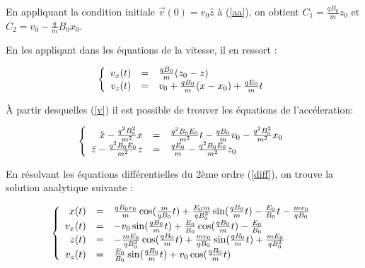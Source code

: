 \documentclass[a4paper,12pt,twoside]{article}
\begin{document}
		En appliquant la condition initiale $ \vec{v}(0) = v_0\hat{z}$ à (\ref{aa}), on obtient $C_1 = \frac{qB_0}{m}z_0 $ et $C_2 = v_0 -\frac{q}{m}B_0x_0$.

			
		En les appliqant dans les \'equations de la vitesse, il en ressort :
				
			\begin{equation}\label{v}
				\left \{
				\begin{array}{r c l}
					v_x(t) & = & \frac{qB_0}{m}(z_0 - z)\\
					v_z(t) & = & v_0 + \frac{qB_0}{m}(x-x_0) + \frac{qE_0}{m}t\\
				\end{array}
				\right .
			\end{equation}
			
		\`A partir desquelles (\ref{v}) il est possible de trouver les \'equations de l'acc\'eleration:
		
			\begin{equation} \label{diff}
				\left \{
				\begin{array}{r c l}
					\ddot{x} - \frac{q^2B_0^2}{m^2}x & = & \frac{q^2B_0E_0}{m^2}t-\frac{qB_0 }{m}v_0 - \frac{q^2B_0^2}{m^2}x_0\\
					
					\ddot{z} -\frac{q^2B_0E_0}{m^2}z& = &  \frac{qE_0}{m} -\frac{q^2B_0E_0}{m^2}z_0\\
				\end{array}
				\right .
			\end{equation}
	
	En r\'esolvant les \'equations diff\'erentielles du 2\`eme ordre (\ref{diff}), on trouve la solution analytique suivante :
	
		\begin{equation} 
			\left \{
			\begin{array}{r c l}
				x(t) & = & \frac{qB_0v_0}{m} \cos(\frac{m}{qB_0}t) + \frac{E_0m}{qB_0^2} \sin(\frac{qB_0}{m}t) -\frac{E_0}{B_0}t - \frac{mv_0}{qB_0} \\
				v_x(t) & = & - v_0 \sin(\frac{qB_0}{m}t) + \frac{E_0}{B_0} \cos(\frac{qB_0}{m}t) -\frac{E_0}{B_0} \\
				z(t) & = & -\frac{mE_0}{qB_0^2} \cos(\frac{qB_0}{m}t) + \frac{mv_0}{qB_0} \sin(\frac{qB_0}{m}t) + \frac{mE_0}{qB_0^2}\\
				v_z(t) & = & \frac{E_0}{B_0} \sin(\frac{qB_0}{m}t) + v_0\cos(\frac{qB_0}{m}t)
			\end{array}
			\right .
		\end{equation}
	
\end{document}
